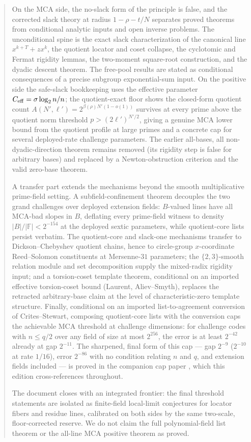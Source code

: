 \documentclass[11pt]{article}
\theoremstyle{definition}
\newcommand{\F}{\mathbb F}
\newcommand{\ceff}{C_{\rm eff}}
\begin{document}
\begin{abstract}
On the MCA side, the no-slack form of the principle is false, and the corrected slack theory at radius $1-\rho-t/N$ separates proved theorems from conditional analytic inputs and open inverse problems.  The unconditional spine is the exact slack characterization of the canonical line $x^{k+T}+zx^k$, the quotient locator and coset collapse, the cyclotomic and Fermat rigidity lemmas, the two-moment square-root construction, and the dyadic descent theorem.  The free-pool results are stated as conditional consequences of a precise subgroup exponential-sum input.  On the positive side the safe-slack bookkeeping uses the effective parameter $\ceff=\sigma\log_2 n/n$; the quotient-exact floor shows the closed-form quotient count $A(N',\ell')=2^{\beta(\rho)N'(1-o(1))}$ survives at every prime above the quotient norm threshold $p>(2\ell')^{N'/2}$, giving a genuine MCA lower bound from the quotient profile at large primes and a concrete cap for several deployed-rate challenge parameters.  The earlier all-bases, all non-dyadic-direction theorem remains removed (its rigidity step is false for arbitrary bases) and replaced by a Newton-obstruction criterion and the valid zero-base theorem.

A transfer part extends the mechanisms beyond the smooth multiplicative prime-field setting.  A subfield-confinement theorem decouples the two grand challenges over deployed extension fields: $B$-valued lines have all MCA-bad slopes in $B$, deflating every prime-field witness to density $|B|/|\F|<2^{-154}$ at the deployed sextic parameters, while quotient-core lists persist verbatim.  The quotient-core and slack-one mechanisms transfer to Dickson--Chebyshev quotient chains, hence to circle-group $x$-coordinate Reed--Solomon constituents at Mersenne-$31$ parameters; the $\{2,3\}$-smooth relation module and set decomposition supply the mixed-radix rigidity input; and a torsion-coset template theorem, conditional on an imported effective torsion-coset bound (Laurent, Aliev--Smyth), replaces the retracted arbitrary-base claim at the level of characteristic-zero template structure.  Finally, conditional on an imported list-to-agreement conversion of Crites--Stewart, composing quotient-core lists with the conversion caps the achievable MCA threshold at challenge dimensions: for challenge codes with $n\le q/2$ over any field of size at most $2^{256}$, the error is at least $2^{-42}$ already at gap $2^{-11}$.  The sharpened, final form of this cap --- gap $2^{-9}$ ($2^{-10}$ at rate $1/16$), error $2^{-86}$ with no condition relating $n$ and $q$, and extension fields included --- is proved in the companion cap paper \cite{UniversalCap}, which this edition cross-references throughout.

The document closes with an integrated frontier: the final threshold statements are isolated as finite-field local-limit conjectures for locator fibers and residue lines, calibrated on both sides by the same two-scale, floor-corrected reserve.  We do not claim the full polynomial-field list theorem or the all-line MCA positive theorem as proved.
\end{abstract}
\end{document}
